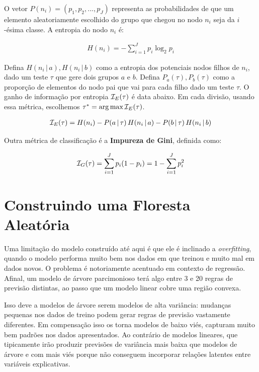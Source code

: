 O vetor $P(n_i) = (p_1, p_2, ..., p_J)$ representa as probabilidades de que um elemento aleatoriamente escolhido do grupo que chegou no nodo $n_i$ seja da $i$-ésima classe. A entropia do nodo $n_i$ é:

\begin{align}
    H(n_i) = - \sum_{i = 1}^J p_i \log_2 p_i
\end{align}

Defina $H(n_i \, | \, a), H(n_i \, |\,  b)$ como a entropia dos potenciais nodos filhos de $n_i$, dado um teste $\tau$ que gere dois grupos $a$ e $b$. Defina $P_a(\tau), P_b(\tau)$ como a proporção de elementos do nodo pai que vai para cada filho dado um teste $\tau$. O ganho de informação por entropia $\mathcal{I}_E(\tau)$ é data abaixo. Em cada divisão, usando essa métrica, escolhemos $\tau^* = \operatorname*{arg\,max}{\mathcal{I}_E(\tau)}$.

\begin{align}
    \mathcal{I}_E(\tau) = H(n_i) - P(a\, |\, \tau) \,H(n_i \, |\,  a) - P(b \,| \,\tau)\, H(n_i \, |\,  b)
\end{align}

 Outra métrica de classificação é a \textbf{Impureza de Gini}, definida como:
 
 \begin{align}
     \mathcal{I}_G(\tau) = \sum_{i = 1}^J p_i ( 1  - p_i) =  1 - \sum_{i = 1}^J p_i^2
 \end{align}


 \section{Construindo uma Floresta Aleatória}
 

Uma limitação do modelo construído até aqui é que ele é inclinado a \textit{overfitting}, quando o modelo performa muito bem nos dados em que treinou e muito mal em dados novos. O problema é notoriamente acentuado em contexto de regressão. Afinal, um modelo de árvore parcimonioso terá algo entre 3 e 20 regras de previsão distintas, ao passo que um modelo linear cobre uma região convexa. 

Isso deve a modelos de árvore serem modelos de alta variância: mudanças pequenas nos dados de treino podem gerar regras de previsão vastamente diferentes. Em compensação isso os torna modelos de baixo viés, capturam muito bem padrões nos dados apresentados. Ao contrário de modelos lineares, que tipicamente irão produzir previsões de variância mais baixa que modelos de árvore e com mais viés porque não conseguem incorporar relações latentes entre variáveis explicativas. 

